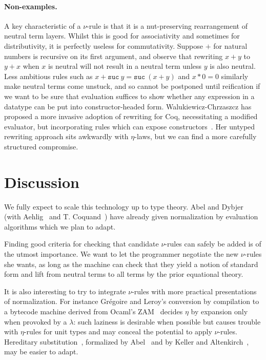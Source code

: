 \documentclass[preprint]{sigplanconf}
\begin{document}
\paragraph{Non-examples.} A key characteristic of a $\nu$-rule is that
it is a nut-preserving rearrangement of neutral term layers. Whilst
this is good for associativity and sometimes for distributivity, it is
perfectly useless for commutativity. Suppose $+$ for natural numbers
is recursive on its first argument, and observe that rewriting $x + y$
to $y + x$ when $x$ is neutral will not result in a neutral term
unless $y$ is also neutral. Less ambitious rules such as
$x+\mathtt{suc}\:y = \mathtt{suc}\:(x+y)$ and $x*0 = 0$ similarly make
neutral terms come unstuck, and so cannot be postponed until
reification if we want to be sure that evaluation suffices to show
whether any expression in a datatype can be put into
constructor-headed form. Walukiewicz-Chrzaszcz has proposed a more
invasive adoption of rewriting for Coq, necessitating a modified
evaluator, but incorporating rules which can expose
constructors~\cite{DBLP:journals/jfp/Walukiewicz-Chrzaszcz03}. Her
untyped rewriting approach sits awkwardly with $\eta$-laws, but we can
find a more carefully structured compromise.


\section{Discussion}

We fully expect to scale this technology up to type theory. Abel and
Dybjer (with Aehlig~\cite{NbeDep1} and T. Coquand~\cite{NbeDep2})
have already given normalization by evaluation algorithms which we
plan to adapt.

Finding good criteria for checking that candidate $\nu$-rules can safely
be added is of the utmost importance. We want to let the
programmer negotiate the new $\nu$-rules she wants, as long as the
machine can check that they yield a notion of standard form and lift
from neutral terms to all terms by the prior equational theory.

It is also interesting to try to integrate $\nu$-rules with more
practical presentations of normalization. For instance Gr\'{e}goire
and Leroy's conversion by compilation to a bytecode machine derived
from Ocaml's ZAM~\cite{ConvTestZAMed} decides $\eta$ by expansion only
when provoked by a $\lambda$: such laziness is desirable when possible
but causes trouble with $\eta$-rules for unit types and may conceal
the potential to apply $\nu$-rules. Hereditary
substitution~\cite{DBLP:conf/types/WatkinsCPW03}, formalized by
Abel~\cite{HeredSubst1} and by Keller and Altenkirch~\cite{HeredSubst2},
may be easier to adapt.
\end{document}
